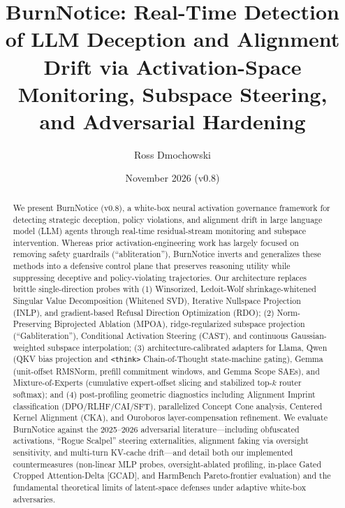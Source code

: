 \documentclass{article}
\title{BurnNotice: Real-Time Detection of LLM Deception and Alignment Drift via Activation-Space Monitoring, Subspace Steering, and Adversarial Hardening}
\author{
  Ross Dmochowski
}
\date{November 2026 (v0.8)}
\begin{document}
\sloppy
\maketitle

\begin{abstract}
We present BurnNotice (v0.8), a white-box neural activation governance framework for detecting strategic deception, policy violations, and alignment drift in large language model (LLM) agents through real-time residual-stream monitoring and subspace intervention. Whereas prior activation-engineering work has largely focused on removing safety guardrails (``abliteration''), BurnNotice inverts and generalizes these methods into a defensive control plane that preserves reasoning utility while suppressing deceptive and policy-violating trajectories. Our architecture replaces brittle single-direction probes with (1) Winsorized, Ledoit-Wolf shrinkage-whitened Singular Value Decomposition (Whitened SVD), Iterative Nullspace Projection (INLP), and gradient-based Refusal Direction Optimization (RDO); (2) Norm-Preserving Biprojected Ablation (MPOA), ridge-regularized subspace projection (``Gabliteration''), Conditional Activation Steering (CAST), and continuous Gaussian-weighted subspace interpolation; (3) architecture-calibrated adapters for Llama, Qwen (QKV bias projection and \texttt{<think>} Chain-of-Thought state-machine gating), Gemma (unit-offset RMSNorm, prefill commitment windows, and Gemma Scope SAEs), and Mixture-of-Experts (cumulative expert-offset slicing and stabilized top-$k$ router softmax); and (4) post-profiling geometric diagnostics including Alignment Imprint classification (DPO/RLHF/CAI/SFT), parallelized Concept Cone analysis, Centered Kernel Alignment (CKA), and Ouroboros layer-compensation refinement. We evaluate BurnNotice against the 2025--2026 adversarial literature---including obfuscated activations, ``Rogue Scalpel'' steering externalities, alignment faking via oversight sensitivity, and multi-turn KV-cache drift---and detail both our implemented countermeasures (non-linear MLP probes, oversight-ablated profiling, in-place Gated Cropped Attention-Delta [GCAD], and HarmBench Pareto-frontier evaluation) and the fundamental theoretical limits of latent-space defenses under adaptive white-box adversaries.
\end{abstract}

\end{document}
